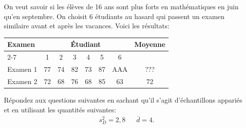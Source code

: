 \begin{questions}
\newpage




\question 

On veut savoir si les élèves de 16 ans sont plus forts en mathématiques en juin qu’en septembre. 
On choisit 6 étudiants au hasard qui passent un examen similaire avant et après les vacances. 
Voici les résultats:
\begin{center}
\renewcommand{\arraystretch}{1.5}
    \begin{tabular}{|l|cccccc|c|}
        \hline
        \multirow{2}{*}{Examen} & \multicolumn{6}{c|}{Étudiant} & \multirow{2}{*}{Moyenne} \\
        \cline{2-7}
         & 1 & 2 & 3 & 4 & 5 & 6 & \\
        \hline
        Examen 1 & 77 & 74 & 82 & 73 & 87 & AAA & ??? \\
        Examen 2 & 72 & 68 & 76 & 68 & 85 & 63 & 72\\
        \hline
    \end{tabular}
\end{center}

Répondez aux questions suivantes en sachant qu'il s'agit d'{échantillons appariés} et en utilisant les quantités suivantes: 
\begin{align*}
    s_D^2=2,8 & & \overline{d}=4.
\end{align*}

\medskip 

\end{questions}
